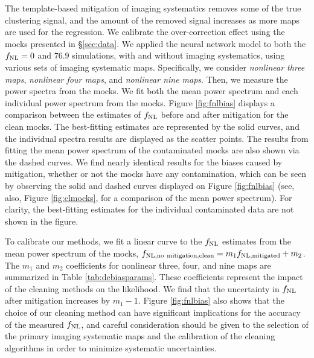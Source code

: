 The template-based mitigation of imaging systematics removes some of the true clustering signal, and the amount of the removed signal increases as more maps are used for the regression. We calibrate the over-correction effect using the mocks presented in \S \ref{sec:data}. We applied the neural network model to both the $f_{\rm NL}=0$ and $76.9$ simulations, with and without imaging systematics, using various sets of imaging systematic maps. Specifically, we consider \textit{nonlinear three maps}, \textit{nonlinear four maps}, and \textit{nonlinear nine maps}. Then, we measure the power spectra from the mocks. We fit both the mean power spectrum and each individual power spectrum from the mocks. Figure \ref{fig:fnlbias} displays a comparison between the estimates of $f_{\rm NL}$ before and after mitigation for the clean mocks. The best-fitting estimates are represented by the solid curves, and the individual spectra results are displayed as the scatter points. The results from fitting the mean power spectrum of the contaminated mocks are also shown via the dashed curves. We find nearly identical results for the biases caused by mitigation, whether or not the mocks have any contamination, which can be seen by observing the solid and dashed curves displayed on Figure \ref{fig:fnlbias} (see, also, Figure \ref{fig:clmocks}, for a comparison of the mean power spectrum). For clarity, the best-fitting estimates for the individual contaminated data are not shown in the figure.

To calibrate our methods, we fit a linear curve to the $f_{\rm NL}$ estimates from the mean power spectrum of the mocks, $f_{\rm NL, no~mitigation, clean} = m_{1} f_{\rm NL, mitigated} + m_{2}$. The $m_{1}$ and $m_{2}$ coefficients for nonlinear three, four, and nine maps are summarized in Table \ref{tab:debiasparams}. These coefficients represent the impact of the cleaning methods on the likelihood. We find that the uncertainty in $f_{\rm NL}$ after mitigation increases by $m_{1}-1$. Figure \ref{fig:fnlbias} also shows that the choice of our cleaning method can have significant implications for the accuracy of the measured $f_{\rm NL}$, and careful consideration should be given to the selection of the primary imaging systematic maps and the calibration of the cleaning algorithms in order to minimize systematic uncertainties.

